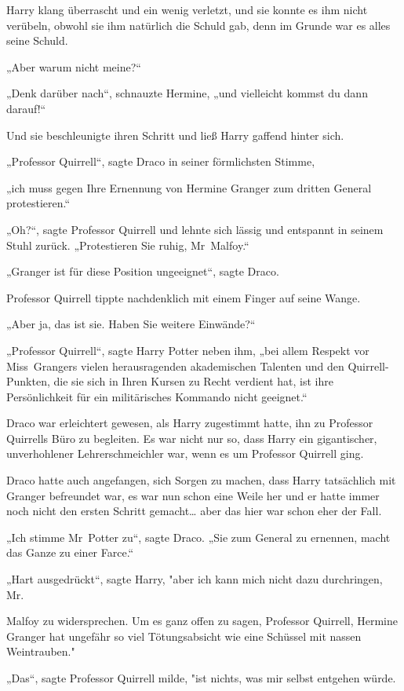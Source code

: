 {Harry klang überrascht und ein wenig verletzt, und sie konnte es ihm nicht verübeln, obwohl sie ihm natürlich die Schuld gab, denn im Grunde war es alles seine Schuld.

„Aber warum nicht meine?“

„Denk darüber nach“, schnauzte Hermine, „und vielleicht kommst du dann darauf!“

Und sie beschleunigte ihren Schritt und ließ Harry gaffend hinter sich.

„Professor Quirrell“, sagte Draco in seiner förmlichsten Stimme,

„ich muss gegen Ihre Ernennung von Hermine Granger zum dritten General protestieren.“

„Oh?“, sagte Professor Quirrell und lehnte sich lässig und entspannt in seinem Stuhl zurück. „Protestieren Sie ruhig, Mr~Malfoy.“

„Granger ist für diese Position ungeeignet“, sagte Draco.

Professor Quirrell tippte nachdenklich mit einem Finger auf seine Wange.

„Aber ja, das ist sie. Haben Sie weitere Einwände?“

„Professor Quirrell“, sagte Harry Potter neben ihm, „bei allem Respekt vor Miss~Grangers vielen herausragenden akademischen Talenten und den Quirrell-Punkten, die sie sich in Ihren Kursen zu Recht verdient hat, ist ihre Persönlichkeit für ein militärisches Kommando nicht geeignet.“

Draco war erleichtert gewesen, als Harry zugestimmt hatte, ihn zu Professor Quirrells Büro zu begleiten. Es war nicht nur so, dass Harry ein gigantischer, unverhohlener Lehrerschmeichler war, wenn es um Professor Quirrell ging.

Draco hatte auch angefangen, sich Sorgen zu machen, dass Harry tatsächlich mit Granger befreundet war, es war nun schon eine Weile her und er hatte immer noch nicht den ersten Schritt gemacht… aber das hier war schon eher der Fall.

„Ich stimme Mr~Potter zu“, sagte Draco. „Sie zum General zu ernennen, macht das Ganze zu einer Farce.“

„Hart ausgedrückt“, sagte Harry, "aber ich kann mich nicht dazu durchringen, Mr.

Malfoy zu widersprechen. Um es ganz offen zu sagen, Professor Quirrell, Hermine Granger hat ungefähr so viel Tötungsabsicht wie eine Schüssel mit nassen Weintrauben."

„Das“, sagte Professor Quirrell milde, "ist nichts, was mir selbst entgehen würde.

}
